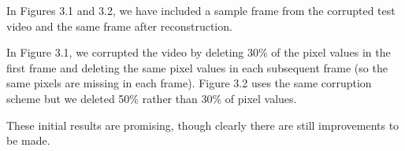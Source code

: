 In Figures 3.1 and 3.2, we have included a sample frame from the corrupted test video and the same frame after reconstruction.

In Figure 3.1, we corrupted the video by deleting 30\% of the pixel values in the first frame and deleting the same pixel values in each subsequent frame (so the same pixels are missing in each frame).
Figure 3.2 uses the same corruption scheme but we deleted 50\% rather than 30\% of pixel values.

These initial results are promising, though clearly there are still improvements to be made.

